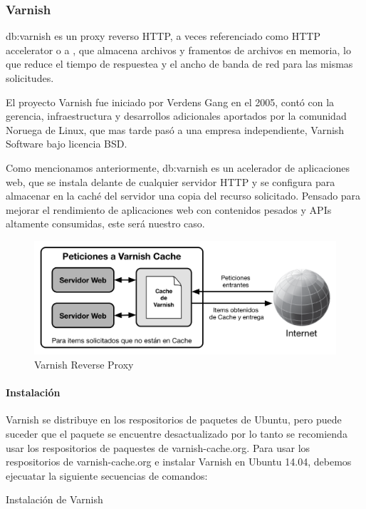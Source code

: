 \subsubsection{Varnish}
\label{soa:tecnologias:varnish}

\gls{db:varnish} es un proxy reverso HTTP, a veces referenciado como HTTP accelerator o a , que almacena archivos y framentos de archivos en memoria, lo que reduce el tiempo de respuestea y el ancho de banda de red para las mismas solicitudes.\cite[p.~20]{varnish2016}

El proyecto Varnish fue iniciado por Verdens Gang en el 2005, contó con la gerencia, infraestructura y desarrollos adicionales aportados por la comunidad Noruega de Linux, que mas tarde pasó a una empresa independiente, Varnish Software bajo licencia BSD.

Como mencionamos anteriormente, \gls{db:varnish} es un acelerador de aplicaciones web, que se instala delante de cualquier servidor HTTP y se configura para almacenar en la caché del servidor una copia del recurso solicitado. Pensado para mejorar el rendimiento de aplicaciones web con contenidos pesados y APIs altamente consumidas, este será nuestro caso.

\begin{figure}[H]
  \includegraphics[width=\linewidth]{src/images/03-capitulo-3/tecnologias/varnish/varnish-reverse-proxy.png}
  \caption{Varnish Reverse Proxy}
  \label{fig:varnish}
\end{figure}

\paragraph{Instalación}

Varnish se distribuye en los respositorios de paquetes de Ubuntu, pero puede suceder que el paquete se encuentre desactualizado por lo tanto se recomienda usar los respositorios de paquestes de varnish-cache.org.
Para usar los respositorios de varnish-cache.org e instalar Varnish en Ubuntu 14.04, debemos ejecuatar la siguiente secuencias de comandos:

\begin{listing}[H]
  \caption{Instalación de Varnish}
  \label{soa:tecnologias:varnish-cache:bash-preparacion}
\end{listing}
